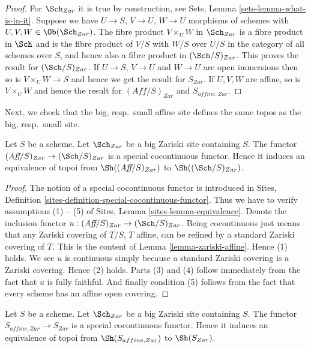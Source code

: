 \begin{proof}
For $\Sch_{Zar}$ it is true by construction, see
Sets, Lemma \ref{sets-lemma-what-is-in-it}.
Suppose we have $U \to S$, $V \to U$, $W \to U$ morphisms
of schemes with $U, V, W \in \Ob(\Sch_{Zar})$.
The fibre product $V \times_U W$ in $\Sch_{Zar}$
is a fibre product in $\Sch$ and
is the fibre product of $V/S$ with $W/S$ over $U/S$ in
the category of all schemes over $S$, and hence also a
fibre product in $(\Sch/S)_{Zar}$.
This proves the result for $(\Sch/S)_{Zar}$.
If $U \to S$, $V \to U$ and $W \to U$ are open immersions then so is
$V \times_U W \to S$ and hence we get the result for $S_{Zar}$.
If $U, V, W$ are affine, so is $V \times_U W$ and hence the
result for $(\textit{Aff}/S)_{Zar}$ and $S_{affine, Zar}$.
\end{proof}

\noindent
Next, we check that the big, resp.\ small affine site defines the same
topos as the big, resp.\ small site.

\begin{lemma}
\label{lemma-affine-big-site-Zariski}
Let $S$ be a scheme. Let $\Sch_{Zar}$ be a big Zariski
site containing $S$.
The functor $(\textit{Aff}/S)_{Zar} \to (\Sch/S)_{Zar}$
is a special cocontinuous functor. Hence it induces an equivalence
of topoi from $\Sh((\textit{Aff}/S)_{Zar})$ to
$\Sh((\Sch/S)_{Zar})$.
\end{lemma}

\begin{proof}
The notion of a special cocontinuous functor is introduced in
Sites, Definition \ref{sites-definition-special-cocontinuous-functor}.
Thus we have to verify assumptions (1) -- (5) of
Sites, Lemma \ref{sites-lemma-equivalence}.
Denote the inclusion functor
$u : (\textit{Aff}/S)_{Zar} \to (\Sch/S)_{Zar}$.
Being cocontinuous just means that any Zariski covering of
$T/S$, $T$ affine, can be refined by a standard Zariski covering of $T$.
This is the content of
Lemma \ref{lemma-zariski-affine}.
Hence (1) holds. We see $u$ is continuous simply because a standard
Zariski covering is a Zariski covering. Hence (2) holds.
Parts (3) and (4) follow immediately from the fact that $u$ is
fully faithful. And finally condition (5) follows from the
fact that every scheme has an affine open covering.
\end{proof}

\begin{lemma}
\label{lemma-alternative-zariski}
Let $S$ be a scheme.  Let $\Sch_{Zar}$ be a big Zariski
site containing $S$. The functor $S_{affine, Zar} \to S_{Zar}$
is a special cocontinuous functor. Hence it induces an equivalence
of topoi from $\Sh(S_{affine, Zar})$ to $\Sh(S_{Zar})$.
\end{lemma}

